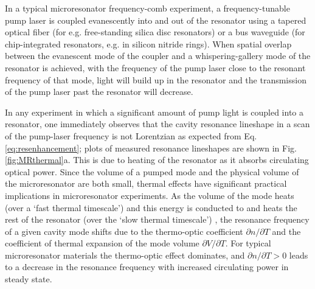 
In a typical microresonator frequency-comb experiment, a frequency-tunable pump laser is coupled evanescently into and out of the resonator using a tapered optical fiber \cite{Spillane2003} (for e.g. free-standing silica disc resonators) or a bus waveguide (for chip-integrated resonators, e.g. in silicon nitride rings). When spatial overlap between the evanescent mode of the coupler and a whispering-gallery mode of the resonator is achieved, with the frequency of the pump laser close to the resonant frequency of that mode, light will build up in the resonator and the transmission of the pump laser past the resonator will decrease.

In any experiment in which a significant amount of pump light is coupled into a resonator, one immediately observes that the cavity resonance lineshape in a scan of the pump-laser frequency is not Lorentzian as expected from Eq. \ref{eq:resenhancement}; plots of measured resonance lineshapes are shown in Fig. \ref{fig:MRthermal}a. This is due to heating of the resonator as it absorbs circulating optical power. Since the volume of a pumped mode and the physical volume of the microresonator are both small, thermal effects have significant practical implications in microresonator experiments. As the volume of the mode heats (over a `fast thermal timescale') and this energy is conducted to and heats the rest of the resonator (over the `slow thermal timescale') \cite{Ilchenko1992}, the resonance frequency of a given cavity mode shifts due to the thermo-optic coefficient $\partial n/\partial T$ and the coefficient of thermal expansion of the mode volume $\partial V/\partial T$. For typical microresonator materials the thermo-optic effect dominates, and $\partial n/\partial T>0$ leads to a decrease in the resonance frequency with increased circulating power in steady state.

